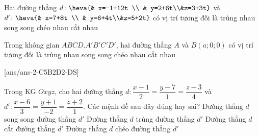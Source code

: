 \begin{ex}%
	Hai đường thẳng $d\colon \heva{& x=-1+12t \\ & y=2+6t\\&z=3+3t}$ và $d'\colon\heva{& x=7+8t \\ & y=6+4t\\&z=5+2t}$ có vị trí tương đối là
	\choice
	{\True trùng nhau}
	{song song}
	{chéo nhau}
	{cắt nhau}
\end{ex}
\begin{ex}%
	Trong không gian $ABCD.A'B'C'D'$, hai đường thẳng $A$ và $B(a;0;0)$ có vị trí tương đối là
	\choice
	{trùng nhau}
	{song song}
	{chéo nhau}
	{\True cắt nhau}
\end{ex}
\TNTF
{}[ans/ans-2-C5B2D2-DS]
\begin{ex}%
	Trong KG $Oxyz$, cho hai đường thẳng $d \colon \dfrac{x-1}{2}=\dfrac{y-7}{1}=\dfrac{z-3}{4}$ và  $d' \colon \dfrac{x-6}{3}=\dfrac{y+1}{-2}=\dfrac{z+2}{1}$. Các mệnh đề sau đây đúng hay sai?
	\choiceTF
	{Đường thẳng $d$ song song đường thẳng $d'$}
	{Đường thẳng $d$ trùng đường thẳng $d'$}
	{\True  Đường thẳng $d$ cắt đường thẳng $d'$}
	{Đường thẳng $d$ chéo đường thẳng $d'$}
\end{ex}
